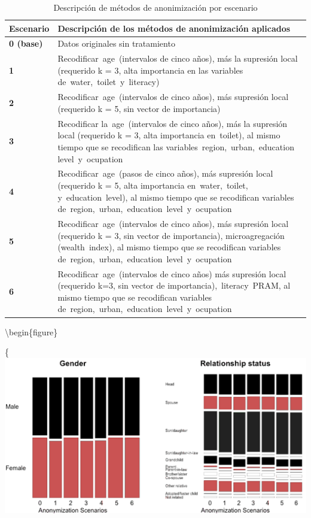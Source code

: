\documentclass[]{book}
\theoremstyle{definition}
\theoremstyle{definition}
\theoremstyle{definition}
\theoremstyle{definition}
\theoremstyle{remark}
\begin{document}
\begin{table}

\caption{\label{tab:tbl3lbn}Descripción de métodos de anonimización por escenario}
\begin{tabu} to 
\hline
Escenario & Descripción de los métodos de anonimización aplicados\\
\hline
\textbf{0 (base)} & Datos originales sin tratamiento\\
\hline
\textbf{1} & Recodificar age (intervalos de cinco años), más la supresión local (requerido k = 3, alta importancia en las variables de water, toilet y literacy)\\
\hline
\textbf{2} & Recodificar age (intervalos de cinco años), más supresión local (requerido k = 5, sin vector de importancia)\\
\hline
\textbf{3} & Recodificar la age (intervalos de cinco años), más la supresión local (requerido k = 3, alta importancia en toilet), al mismo tiempo que se recodifican las variables region, urban, education level y ocupation\\
\hline
\textbf{4} & Recodificar age (pasos de cinco años), más supresión local (requerido k = 5, alta importancia en water, toilet, y education level), al mismo tiempo que se recodifican variables de region, urban, education level y ocupation\\
\hline
\textbf{5} & Recodificar age (intervalos de cinco años), más supresión local (requerido k = 3, sin vector de importancia), microagregación (wealth index), al mismo tiempo que se recodifican variables de region, urban, education level y ocupation\\
\hline
\textbf{6} & Recodificar age (intervalos de cinco años) más supresión local (requerido k=3, sin vector de importancia), literacy PRAM, al mismo tiempo que se recodifican variables de region, urban, education level y ocupation\\
\hline
\end{tabu}
\end{table}

\textbackslash{}begin\{figure\}

\{\centering \includegraphics[width=0.9\linewidth]{Imagenes/fig7}
\end{document}
